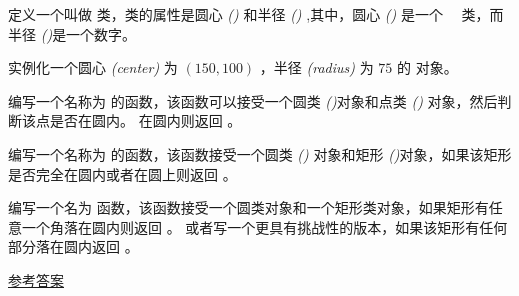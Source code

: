 \begin{exercise}


定义一个叫做 {\em {}} 类，类的属性是圆心 {\em ()}  和半径 {\em ()} ,其中，圆心 {\em ()} 是一个　{\em {}} 类，而半径 {\em ()}是一个数字。


实例化一个圆心 {\em (center)} 为 $(150, 100)$ ，半径 {\em (radius)} 为 $75$ 的 {\em {}} 对象。


编写一个名称为 {\em {}} 的函数，该函数可以接受一个圆类 {\em ()}对象和点类 {\em ()} 对象，然后判断该点是否在圆内。 在圆内则返回 {\em {}} 。


编写一个名称为 {\em {}} 的函数，该函数接受一个圆类 {\em ()} 对象和矩形 {\em ()}对象，如果该矩形是否完全在圆内或者在圆上则返回 {\em {}} 。


编写一个名为 {\em {}} 函数，该函数接受一个圆类对象和一个矩形类对象，如果矩形有任意一个角落在圆内则返回 {\em {}} 。 或者写一个更具有挑战性的版本，如果该矩形有任何部分落在圆内返回 {\em {}} 。


\href{http://thinkpython2.com/code/Circle.py}{参考答案}

\end{exercise}

